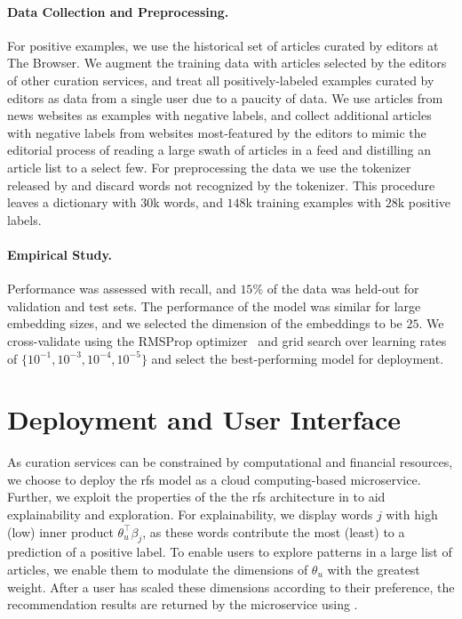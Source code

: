 \paragraph{Data Collection and Preprocessing.} For positive examples, we use the historical set of articles curated by editors at The Browser. We augment the training data with articles selected by the editors of other curation services, and treat all positively-labeled examples curated by editors as data from a single user due to a paucity of data. We use articles from news websites as examples with negative labels, and collect additional articles with negative labels from websites most-featured by the editors to mimic the editorial process of reading a large swath of articles in a feed and distilling an article list to a select few. For preprocessing the data we use the tokenizer released by \citet{devlin2019bert:} and discard words not recognized by the tokenizer. This procedure leaves a dictionary with $30$k words, and $148$k training examples with $28$k positive labels.

\paragraph{Empirical Study.} Performance was assessed with recall, and $15\%$ of the data was held-out for validation and test sets. The performance of the model was similar for large embedding sizes, and we selected the dimension of the embeddings to be $25$. We cross-validate using the RMSProp optimizer~\citep{tieleman2012lecture} and grid search over learning rates of $\{10^{-1}, 10^{-3}, 10^{-4}, 10^{-5}\}$ and select the best-performing model for deployment.

\section{Deployment and User Interface}

As curation services can be constrained by computational and financial resources, we choose to deploy the \gls{rfs} model as a cloud computing-based microservice. Further, we exploit the properties of the the \gls{rfs} architecture in  to aid explainability and exploration. For explainability, we display words $j$ with high (low) inner product $\theta_u^\top\beta_j$, as these words contribute the most (least) to a prediction of a positive label. To enable users to explore patterns in a large list of articles, we enable them to modulate the dimensions of $\theta_u$ with the greatest weight. After a user has scaled these dimensions according to their preference, the recommendation results are returned by the microservice using .

